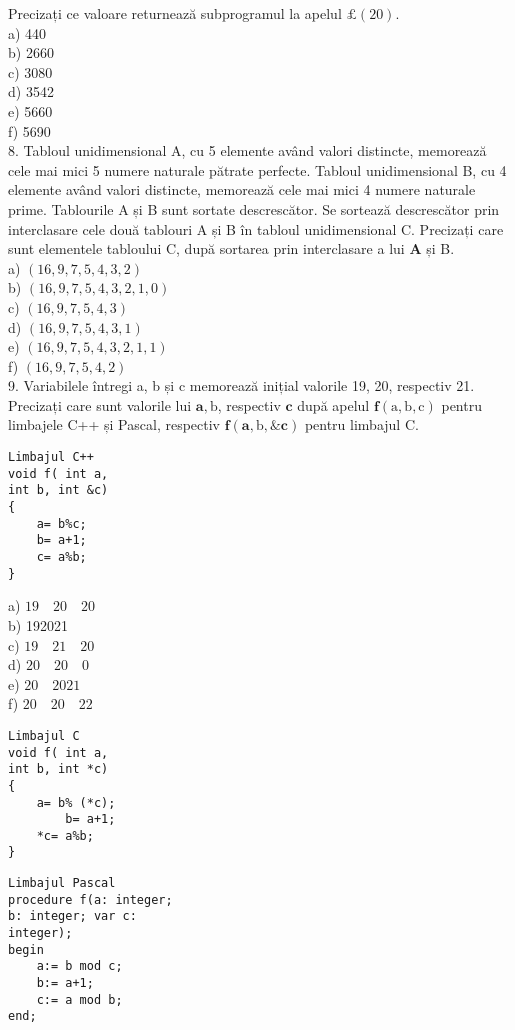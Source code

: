 Precizați ce valoare returnează subprogramul la apelul $\pounds(20)$.\\
a) 440\\
b) 2660\\
c) 3080\\
d) 3542\\
e) 5660\\
f) 5690\\
8. Tabloul unidimensional A, cu 5 elemente având valori distincte, memorează cele mai mici 5 numere naturale pătrate perfecte. Tabloul unidimensional B, cu 4 elemente având valori distincte, memorează cele mai mici 4 numere naturale prime. Tablourile A și B sunt sortate descrescător. Se sortează descrescător prin interclasare cele două tablouri A și B în tabloul unidimensional C. Precizați care sunt elementele tabloului C, după sortarea prin interclasare a lui $\mathbf{A}$ și B.\\
a) $(16,9,7,5,4,3,2)$\\
b) $(16,9,7,5,4,3,2,1,0)$\\
c) $(16,9,7,5,4,3)$\\
d) $(16,9,7,5,4,3,1)$\\
e) $(16,9,7,5,4,3,2,1,1)$\\
f) $(16,9,7,5,4,2)$\\
9. Variabilele întregi a, b și c memorează inițial valorile 19, 20, respectiv 21. Precizați care sunt valorile lui $\mathbf{a}, \mathrm{b}$, respectiv $\mathbf{c}$ după apelul $\mathbf{f}(\mathrm{a}, \mathrm{b}, \mathrm{c})$ pentru limbajele C++ și Pascal, respectiv $\mathbf{f}(\mathbf{a}, \mathrm{b}, \& \mathbf{c})$ pentru limbajul C.

\begin{verbatim}
Limbajul C++
void f( int a,
int b, int &c)
{
    a= b%c;
    b= a+1;
    c= a%b;
}
\end{verbatim}

a) $19 \quad 20 \quad 20$\\
b) 192021\\
c) $19 \quad 21 \quad 20$\\
d) $20 \quad 20 \quad 0$\\
e) $20 \quad 2021$\\
f) $20 \quad 20 \quad 22$

\begin{verbatim}
Limbajul C
void f( int a,
int b, int *c)
{
    a= b% (*c);
        b= a+1;
    *c= a%b;
}
\end{verbatim}

\begin{verbatim}
Limbajul Pascal
procedure f(a: integer;
b: integer; var c:
integer);
begin
    a:= b mod c;
    b:= a+1;
    c:= a mod b;
end;
\end{verbatim}

